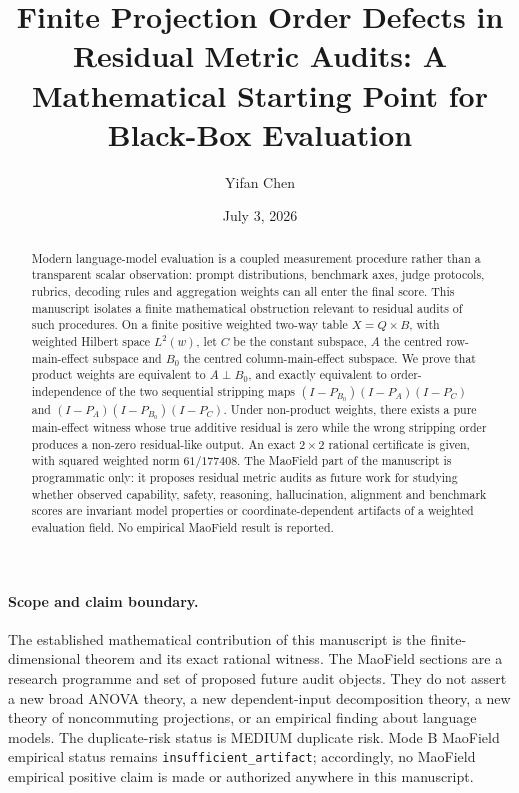 \documentclass[11pt]{article}
\title{Finite Projection Order Defects in Residual Metric Audits: A Mathematical Starting Point for Black-Box Evaluation}
\author{Yifan Chen}
\affil{MaoField research programme}
\date{July 3, 2026}
\theoremstyle{remark}
\begin{document}
\maketitle

\begin{abstract}
Modern language-model evaluation is a coupled measurement procedure rather than a transparent scalar observation: prompt distributions, benchmark axes, judge protocols, rubrics, decoding rules and aggregation weights can all enter the final score. This manuscript isolates a finite mathematical obstruction relevant to residual audits of such procedures. On a finite positive weighted two-way table $X=Q\times B$, with weighted Hilbert space $L^2(w)$, let $C$ be the constant subspace, $A$ the centred row-main-effect subspace and $B_0$ the centred column-main-effect subspace. We prove that product weights are equivalent to $A\perp B_0$, and exactly equivalent to order-independence of the two sequential stripping maps $(I-P_{B_0})(I-P_A)(I-P_C)$ and $(I-P_A)(I-P_{B_0})(I-P_C)$. Under non-product weights, there exists a pure main-effect witness whose true additive residual is zero while the wrong stripping order produces a non-zero residual-like output. An exact $2\times2$ rational certificate is given, with squared weighted norm $61/177408$. The MaoField part of the manuscript is programmatic only: it proposes residual metric audits as future work for studying whether observed capability, safety, reasoning, hallucination, alignment and benchmark scores are invariant model properties or coordinate-dependent artifacts of a weighted evaluation field. No empirical MaoField result is reported.
\end{abstract}

\paragraph{Scope and claim boundary.}
The established mathematical contribution of this manuscript is the finite-dimensional theorem and its exact rational witness. The MaoField sections are a research programme and set of proposed future audit objects. They do not assert a new broad ANOVA theory, a new dependent-input decomposition theory, a new theory of noncommuting projections, or an empirical finding about language models. The duplicate-risk status is MEDIUM duplicate risk. Mode B MaoField empirical status remains \texttt{insufficient\_artifact}; accordingly, no MaoField empirical positive claim is made or authorized anywhere in this manuscript.
\end{document}
